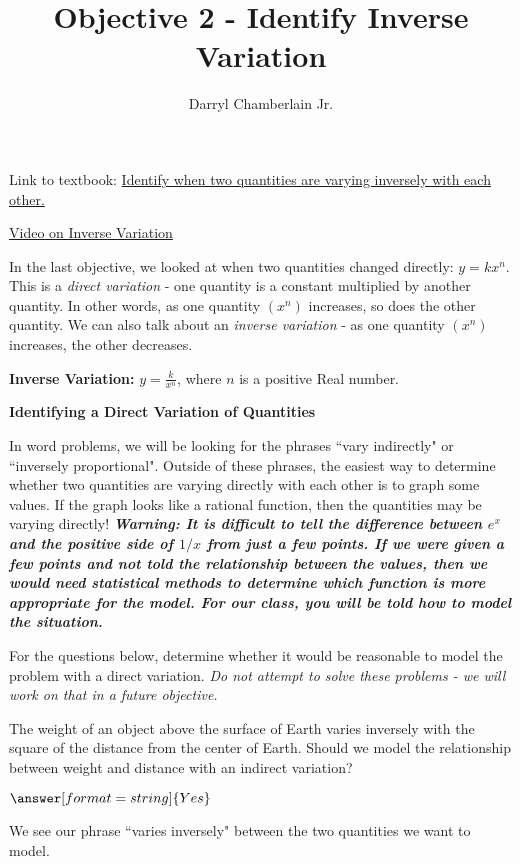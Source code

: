 \documentclass{ximera}
\author{Darryl Chamberlain Jr.}
\title{Objective 2 - Identify Inverse Variation}
\begin{document}
\begin{abstract}
		
\end{abstract}
	
\maketitle
	
Link to textbook: 
\href{https://cnx.org/contents/mwjClAV_@8.12:yUH0hROr@12/Modeling-Using-Variation}{Identify when two quantities are varying inversely with each other.}
	
\href{https://www.youtube.com/watch?v=awp2vxqd-l4}{Video on Inverse Variation}
	
	
In the last objective, we looked at when two quantities changed directly: $y=kx^n$. This is a \textit{direct variation} - one quantity is a constant multiplied by another quantity. In other words, as one quantity $(x^n)$ increases, so does the other quantity. We can also talk about an \textit{inverse variation} - as one quantity $(x^n)$ increases, the other decreases. 
	
\textbf{Inverse Variation:} $y = \frac{k}{x^n}$, where $n$ is a positive Real number. 
	
\textbf{Identifying a Direct Variation of Quantities}
	
In word problems, we will be looking for the phrases ``vary indirectly" or ``inversely proportional". Outside of these phrases, the easiest way to determine whether two quantities are varying directly with each other is to graph some values. If the graph looks like a rational function, then the quantities may be varying directly! \textbf{\textit{Warning: It is difficult to tell the difference between $e^x$ and the positive side of $1/x$ from just a few points. If we were given a few points and not told the relationship between the values, then we would need statistical methods to determine which function is more appropriate for the model. For our class, you will be told how to model the situation.}} 
	
For the questions below, determine whether it would be reasonable to model the problem with a direct variation. \textit{Do not attempt to solve these problems - we will work on that in a future objective.}

\begin{question}
[Astronomy] The weight of an object above the surface of Earth varies inversely with the square of the distance from the center of Earth. Should we model the relationship between weight and distance with an indirect variation?

$\answer[format=string]{Yes}$

\begin{feedback}
We see our phrase ``varies inversely" between the two quantities we want to model. 
\end{feedback}
\end{question}
\end{document}
